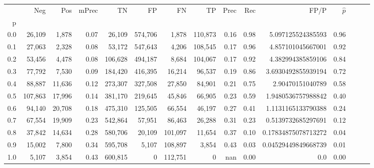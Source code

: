 \begin{tabular}{rrrrrrrrrrrrrrr}
\toprule
{} &      Neg &     Pos & mPrec &       TN &       FP &       FN &       TP &  Prec &   Rec &                 FP/P & $\hat{p}$ \\
p   &          &         &       &          &          &          &          &       &       &                      &           \\
\midrule
0.0 &   26,109 &   1,878 &  0.07 &   26,109 &  574,706 &    1,878 &  110,873 &  0.16 &  0.98 &    5.097125524385593 &      0.96 \\
0.1 &   27,063 &   2,328 &  0.08 &   53,172 &  547,643 &    4,206 &  108,545 &  0.17 &  0.96 &    4.857101045667001 &      0.92 \\
0.2 &   53,456 &   4,478 &  0.08 &  106,628 &  494,187 &    8,684 &  104,067 &  0.17 &  0.92 &    4.382994385859106 &      0.84 \\
0.3 &   77,792 &   7,530 &  0.09 &  184,420 &  416,395 &   16,214 &   96,537 &  0.19 &  0.86 &   3.6930492855939194 &      0.72 \\
0.4 &   88,887 &  11,636 &  0.12 &  273,307 &  327,508 &   27,850 &   84,901 &  0.21 &  0.75 &     2.90470151040789 &      0.58 \\
0.5 &  107,863 &  17,996 &  0.14 &  381,170 &  219,645 &   45,846 &   66,905 &  0.23 &  0.59 &   1.9480536757988842 &      0.40 \\
0.6 &   94,140 &  20,708 &  0.18 &  475,310 &  125,505 &   66,554 &   46,197 &  0.27 &  0.41 &   1.1131165133790388 &      0.24 \\
0.7 &   67,554 &  19,909 &  0.23 &  542,864 &   57,951 &   86,463 &   26,288 &  0.31 &  0.23 &   0.5139732685297691 &      0.12 \\
0.8 &   37,842 &  14,634 &  0.28 &  580,706 &   20,109 &  101,097 &   11,654 &  0.37 &  0.10 &  0.17834875078713272 &      0.04 \\
0.9 &   15,002 &   7,800 &  0.34 &  595,708 &    5,107 &  108,897 &    3,854 &  0.43 &  0.03 &  0.04529449849668739 &      0.01 \\
1.0 &    5,107 &   3,854 &  0.43 &  600,815 &        0 &  112,751 &        0 &   nan &  0.00 &                  0.0 &      0.00 \\
\bottomrule
\end{tabular}
